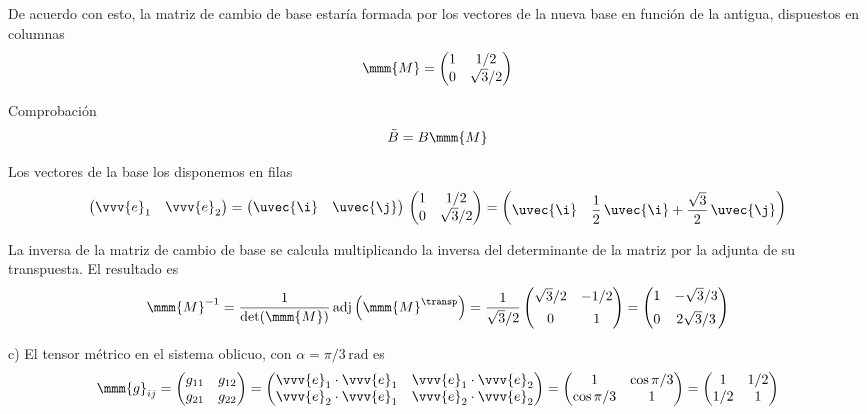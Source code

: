 De acuerdo con esto, la matriz de cambio de base estaría formada por los vectores de la
nueva base en función de la antigua, dispuestos en columnas
\[
  \mmm{M}
  = \begin{pmatrix}
    1 & 1/2\\
    0 & \sqrt{3}/2
  \end{pmatrix}
\]

{\footnotesize
Comprobación
\[
  \tilde{B} = B \mmm{M}
\]

Los vectores de la base los disponemos en filas
\[
  \begin{pmatrix}
    \vvv{e}_1 & \vvv{e}_2
  \end{pmatrix}
  =
  \begin{pmatrix}
    \uvec{\i} & \uvec{\j}
  \end{pmatrix}
  \,
  \begin{pmatrix}
    1 & 1/2\\
    0 & \sqrt{3}/2
  \end{pmatrix}
  =
  \begin{pmatrix}
    \uvec{\i} & \dfrac{1}{2}\,\uvec{\i} + \dfrac{\sqrt{3}}{2}\,\uvec{\j}
  \end{pmatrix}
\]
}
La inversa de la matriz de cambio de base se calcula multiplicando la inversa del
determinante de la matriz por la adjunta de su transpuesta. El resultado es
\[
  \mmm{M}^{-1}
  = \dfrac{1}{\det(\mmm{M})}\,\text{adj}\left(\mmm{M}^\transp\right)
  = \dfrac{1}{\sqrt{3}/2}
  \begin{pmatrix}
    \sqrt{3}/2 & -1/2\\[1ex]
    0 & 1
  \end{pmatrix}
  =
  \begin{pmatrix}
    1 & -\sqrt{3}/3\\[1ex]
    0 & 2\sqrt{3}/3
  \end{pmatrix}
\]

\noindent
c) El tensor métrico en el sistema oblicuo, con $\alpha = \pi/3\,\unit{\radian}$ es
\[
  \mmm{g}_{ij}
  =\begin{pmatrix}
    g_{11} & g_{12}\\
    g_{21} & g_{22}
  \end{pmatrix}
  = \begin{pmatrix}
    \vvv{e}_1\cdot\vvv{e}_1 & \vvv{e}_1\cdot\vvv{e}_2\\
    \vvv{e}_2\cdot\vvv{e}_1 & \vvv{e}_2\cdot\vvv{e}_2\\
  \end{pmatrix}
  = \begin{pmatrix}
    1 & \cos\pi/3\\
    \cos\pi/3 & 1
  \end{pmatrix}
  =
  \begin{pmatrix}
    1 & 1/2\\
    1/2 & 1
  \end{pmatrix}
\]

